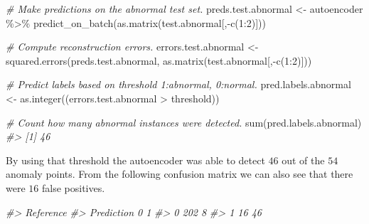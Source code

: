 \documentclass[
  11pt,
]{krantz}
\newenvironment{Shaded}{\begin{snugshade}}{\end{snugshade}}
\newcommand{\CommentTok}[1]{\textcolor[rgb]{0.37,0.37,0.37}{\textit{#1}}}
\newcommand{\DecValTok}[1]{\textcolor[rgb]{0.06,0.06,0.06}{#1}}
\newcommand{\FunctionTok}[1]{\textcolor[rgb]{0,0,0}{#1}}
\newcommand{\NormalTok}[1]{#1}
\newcommand{\OtherTok}[1]{\textcolor[rgb]{0.37,0.37,0.37}{#1}}
\newcommand{\SpecialCharTok}[1]{\textcolor[rgb]{0,0,0}{#1}}
\begin{document}
\begin{Shaded}
\begin{Highlighting}[]
\CommentTok{\# Make predictions on the abnormal test set.}
\NormalTok{preds.test.abnormal }\OtherTok{\textless{}{-}}\NormalTok{ autoencoder }\SpecialCharTok{\%\textgreater{}\%}
  \FunctionTok{predict\_on\_batch}\NormalTok{(}\FunctionTok{as.matrix}\NormalTok{(test.abnormal[,}\SpecialCharTok{{-}}\FunctionTok{c}\NormalTok{(}\DecValTok{1}\SpecialCharTok{:}\DecValTok{2}\NormalTok{)]))}

\CommentTok{\# Compute reconstruction errors.}
\NormalTok{errors.test.abnormal }\OtherTok{\textless{}{-}} \FunctionTok{squared.errors}\NormalTok{(preds.test.abnormal,}
                                       \FunctionTok{as.matrix}\NormalTok{(test.abnormal[,}\SpecialCharTok{{-}}\FunctionTok{c}\NormalTok{(}\DecValTok{1}\SpecialCharTok{:}\DecValTok{2}\NormalTok{)]))}

\CommentTok{\# Predict labels based on threshold 1:abnormal, 0:normal.}
\NormalTok{pred.labels.abnormal }\OtherTok{\textless{}{-}} \FunctionTok{as.integer}\NormalTok{((errors.test.abnormal }\SpecialCharTok{\textgreater{}}\NormalTok{ threshold))}

\CommentTok{\# Count how many abnormal instances were detected.}
\FunctionTok{sum}\NormalTok{(pred.labels.abnormal)}
\CommentTok{\#\textgreater{} [1] 46}
\end{Highlighting}
\end{Shaded}

By using that threshold the autoencoder was able to detect \(46\) out of the \(54\) anomaly points. From the following confusion matrix we can also see that there were \(16\) false positives.

\begin{Shaded}
\begin{Highlighting}[]

\CommentTok{\#\textgreater{}           Reference}
\CommentTok{\#\textgreater{} Prediction   0   1}
\CommentTok{\#\textgreater{}          0 202   8}
\CommentTok{\#\textgreater{}          1  16  46}
\end{Highlighting}
\end{Shaded}
\end{document}

